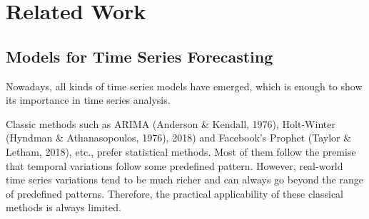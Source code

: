 \section{Related Work}
\label{sec:Related_Work}

\subsection{Models for Time Series Forecasting}





Nowadays, all kinds of time series models have emerged, which is enough to show its importance in time series analysis.

Classic methods such as ARIMA (Anderson \& Kendall, 1976), Holt-Winter (Hyndman \& Athanasopoulos, 1976), 2018) and Facebook's Prophet (Taylor \& Letham, 2018), etc., prefer statistical methods. Most of them follow the premise that temporal variations follow some predefined pattern. However, real-world time series variations tend to be much richer and can always go beyond the range of predefined patterns. Therefore, the practical applicability of these classical methods is always limited.

